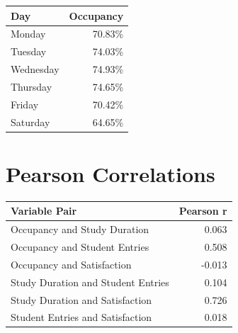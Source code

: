 \begin{tabular}{lr}
	\textbf{Day} & \textbf{Occupancy} \\
	\hline
	Monday & 70.83\% \\
	Tuesday & 74.03\% \\
	Wednesday & 74.93\% \\
	Thursday & 74.65\% \\
	Friday & 70.42\% \\
	Saturday & 64.65\% \\
\end{tabular}

\section*{Pearson Correlations}

\begin{tabular}{lr}
	\textbf{Variable Pair} & \textbf{Pearson r} \\
	\hline
	Occupancy and Study Duration & 0.063 \\
	Occupancy and Student Entries & 0.508 \\
	Occupancy and Satisfaction & -0.013 \\
	Study Duration and Student Entries & 0.104 \\
	Study Duration and Satisfaction & 0.726 \\
	Student Entries and Satisfaction & 0.018 \\
\end{tabular}
